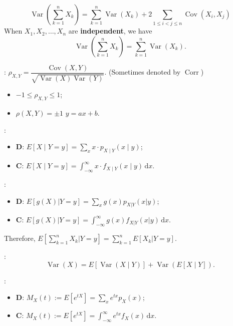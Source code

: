 \[\operatorname{Var}\left(\sum\limits_{k=1}^{n}X_k\right) =
\sum\limits_{k=1}^{n}\operatorname{Var}\left(X_k\right)+2\sum_{1 \leq i < j
\leq n} \operatorname{Cov}\left(X_i,X_j\right)\]
When \(X_1, X_2, \ldots, X_n\) are \textbf{independent}, we have
\[\operatorname{Var}\left(\sum\limits_{k=1}^{n}X_k\right) =
\sum\limits_{k=1}^{n}\operatorname{Var}\left(X_k\right).\]

: 
\(\rho_{X,Y} = \dfrac{\operatorname{Cov}\left(X,Y\right)}
{\sqrt{\operatorname{Var}\left(X\right)\operatorname{Var}\left(Y\right)}}\).
(Sometimes denoted by \(\operatorname{Corr}\))
\begin{multicols}{2}
\begin{itemize}
  \item \(-1 \leq \rho_{X,Y} \leq 1\);
  \item \(\rho\left(X,Y\right)= \pm 1\) \tf \(y = ax + b\).
\end{itemize}
\end{multicols}

:
\begin{itemize}
  \item \textbf{D}: \(E\left[X\mid Y=y\right]=\sum\limits_{x}x\cdot p_{X\mid Y}\left(x\mid
y\right)\);
  \item \textbf{C}: \(E\left[X\mid Y=y\right]=\int_{-\infty}^{\infty}x\cdot f_{X\mid Y}\left(x\mid
y\right)\,\mathrm{d}x\).
\end{itemize}

:
\begin{itemize}
  \item \textbf{D}: \(E[g(X)|Y=y] = \sum_x g(x)p_{X|Y}(x|y)\);
  \item \textbf{C}: \(E[g(X)|Y=y] = \int_{-\infty}^{\infty}
    g(x)f_{X|Y}(x|y)\,\mathrm{d}x\).
\end{itemize}
Therefore, \(E\left[\sum\limits_{k=1}^{n}X_k | Y=y\right] =
\sum\limits_{k=1}^{n}E[X_k|Y = y]\).

:
\[\operatorname{Var}\left(X\right)=E\left[\operatorname{Var}\left(X\mid
Y\right)\right]+\operatorname{Var}\left(E\left[X\mid Y\right]\right).\]

:
\begin{itemize}
  \item \textbf{D}: \(M_X(t) := E[e^{tX}] = \sum_x e^{tx}p_X(x)\);
  \item \textbf{C}: \(M_X(t) := E[e^{tX}] = \int_{-\infty}^{\infty}
    e^{tx}f_X(x)\,\mathrm{d}x\).
\end{itemize}

